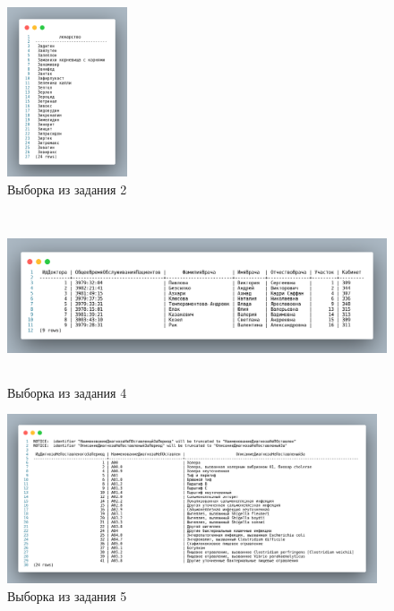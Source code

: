 









\newpage



\begin{figure}[p!h]
  \centering

  \includegraphics[height=5cm]
  {../sql/select/2-out.png}

  \caption{Выборка из задания 2}

  \label{fig:t2}
\end{figure}

\begin{figure}[p!h]
  \centering

  \includegraphics[height=5cm]
  {../sql/select/4-out.png}

  \caption{Выборка из задания 4}

  \label{fig:t4}
\end{figure}

\begin{figure}[p!h]
  \centering

  \includegraphics[height=5cm]
  {../sql/select/5-out.png}

  \caption{Выборка из задания 5}

  \label{fig:t5}
\end{figure}

